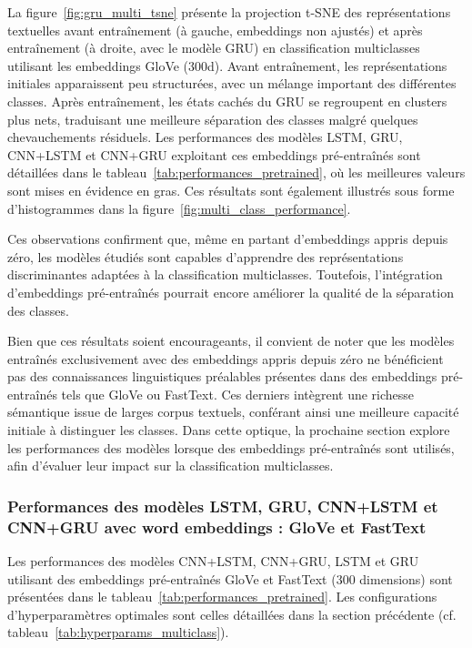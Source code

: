 \documentclass[12pt]{report}
\begin{document}
La figure~\ref{fig:gru_multi_tsne} présente la projection t-SNE des représentations textuelles avant entraînement (à gauche, embeddings non ajustés) et après entraînement (à droite, avec le modèle GRU) en classification multiclasses utilisant les embeddings GloVe (300d). Avant entraînement, les représentations initiales apparaissent peu structurées, avec un mélange important des différentes classes. Après entraînement, les états cachés du GRU se regroupent en clusters plus nets, traduisant une meilleure séparation des classes malgré quelques chevauchements résiduels. Les performances des modèles LSTM, GRU, CNN+LSTM et CNN+GRU exploitant ces embeddings pré-entraînés sont détaillées dans le tableau~\ref{tab:performances_pretrained}, où les meilleures valeurs sont mises en évidence en gras. Ces résultats sont également illustrés sous forme d’histogrammes dans la figure~\ref{fig:multi_class_performance}.

Ces observations confirment que, même en partant d’embeddings appris depuis zéro, les modèles étudiés sont capables d’apprendre des représentations discriminantes adaptées à la classification multiclasses. Toutefois, l’intégration d’embeddings pré-entraînés pourrait encore améliorer la qualité de la séparation des classes.

Bien que ces résultats soient encourageants, il convient de noter que les modèles entraînés exclusivement avec des embeddings appris depuis zéro ne bénéficient pas des connaissances linguistiques préalables présentes dans des embeddings pré-entraînés tels que GloVe ou FastText. Ces derniers intègrent une richesse sémantique issue de larges corpus textuels, conférant ainsi une meilleure capacité initiale à distinguer les classes. Dans cette optique, la prochaine section explore les performances des modèles lorsque des embeddings pré-entraînés sont utilisés, afin d’évaluer leur impact sur la classification multiclasses.

\subsubsection{Performances des modèles LSTM, GRU, CNN+LSTM et CNN+GRU avec word embeddings : GloVe et FastText}

Les performances des modèles CNN+LSTM, CNN+GRU, LSTM et GRU utilisant des embeddings pré-entraînés GloVe et FastText (300 dimensions) sont présentées dans le tableau~\ref{tab:performances_pretrained}. Les configurations d’hyperparamètres optimales sont celles détaillées dans la section précédente (cf. tableau~\ref{tab:hyperparams_multiclass}).
\end{document}
